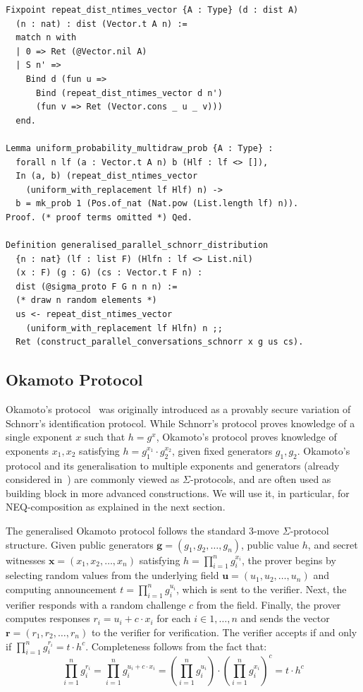 \begin{lstlisting}[frame=single, language=Coq, caption={Composition of a Distribution},
label={dist_comp},captionpos=t, basicstyle=\ttfamily\scriptsize,
abovecaptionskip=-\medskipamount]
Fixpoint repeat_dist_ntimes_vector {A : Type} (d : dist A)
  (n : nat) : dist (Vector.t A n) :=
  match n with
  | 0 => Ret (@Vector.nil A)
  | S n' =>
    Bind d (fun u =>
      Bind (repeat_dist_ntimes_vector d n')
      (fun v => Ret (Vector.cons _ u _ v)))
  end.

Lemma uniform_probability_multidraw_prob {A : Type} :
  forall n lf (a : Vector.t A n) b (Hlf : lf <> []),
  In (a, b) (repeat_dist_ntimes_vector
    (uniform_with_replacement lf Hlf) n) ->
  b = mk_prob 1 (Pos.of_nat (Nat.pow (List.length lf) n)).
Proof. (* proof terms omitted *) Qed.

Definition generalised_parallel_schnorr_distribution
  {n : nat} (lf : list F) (Hlfn : lf <> List.nil)
  (x : F) (g : G) (cs : Vector.t F n) :
  dist (@sigma_proto F G n n n) :=
  (* draw n random elements *)
  us <- repeat_dist_ntimes_vector
    (uniform_with_replacement lf Hlfn) n ;;
  Ret (construct_parallel_conversations_schnorr x g us cs).
\end{lstlisting}

\subsection{Okamoto Protocol}

Okamoto's protocol~\cite[Identification scheme 1]{okamoto1992provably} was originally introduced as a provably secure variation of Schnorr's identification protocol.
While Schnorr's protocol proves knowledge of a single exponent $x$ such that $h = g^x$, Okamoto's protocol proves knowledge of
exponents $x_1, x_2$ satisfying $h = g_1^{x_1} \cdot g_2^{x_2}$, given fixed generators $g_1,g_2$. Okamoto's protocol and its generalisation to multiple exponents and generators
(already considered in~\cite{10.1007/3-540-39118-5_13}) are commonly viewed as $\Sigma$-protocols, and are often used as building block in more advanced constructions.
We will use it, in particular, for NEQ-composition as explained in the next section.

The generalised Okamoto protocol follows the standard 3-move $\Sigma$-protocol structure. Given public generators $\mathbf{g} = (g_1, g_2, \ldots, g_n)$, public value $h$, and secret witnesses $\mathbf{x} = (x_1, x_2, \ldots, x_n)$ satisfying $h = \prod_{i=1}^{n} g_i^{x_i}$, the prover begins by selecting random values from the underlying field $\mathbf{u} = (u_1, u_2, \ldots, u_n)$ and computing announcement $t = \prod_{i=1}^{n} g_i^{u_i}$, which is sent to the verifier. Next, the verifier responds with a random challenge $c$ from the field. Finally, the prover computes responses $r_i = u_i + c \cdot x_i$ for each $i \in {1, \ldots, n}$ and sends the vector $\mathbf{r} = (r_1, r_2, \ldots, r_n)$ to the verifier for verification. The verifier accepts if and only if
$\prod_{i=1}^{n} g_i^{r_i} = t \cdot h^c$. Completeness follows from the fact that:
\[
\prod_{i=1}^{n} g_i^{r_i} = \prod_{i=1}^{n} g_i^{u_i + c \cdot x_i} =
\left(\prod_{i=1}^{n} g_i^{u_i}\right) \cdot \left(\prod_{i=1}^{n} g_i^{x_i}\right)^c = t \cdot h^c
\]

